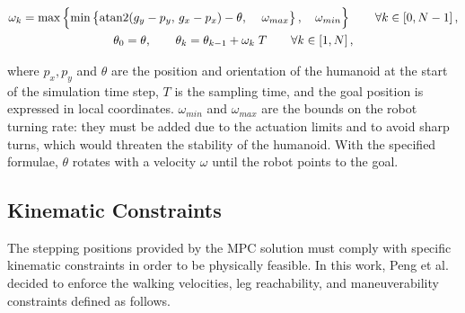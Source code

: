 \documentclass[main.tex]{subfiles}
\begin{document}
\begin{gather}
\omega_k = \max \left\{ \min \left\{ \operatorname{atan2}(g_y - p_y,\, g_x - p_x) - \theta,\, \quad \omega_{max} \right\} ,\quad \omega_{min} \right\} \qquad \forall k \in \left[0, N-1 \right], \notag \\
\theta_0 = \theta, \qquad \theta_k = \theta_{k-1} + \omega_k\;T \qquad \forall k \in \left[1, N\right], \notag
\end{gather}

where $p_x, p_y$ and $\theta$ are the position and orientation of the humanoid at the start of the simulation time step, $T$ is the sampling time, and the goal position is expressed in local coordinates. $\omega_{min}$ and $\omega_{max}$ are the bounds on the robot turning rate: they must be added due to the actuation limits and to avoid sharp turns, which would threaten the stability of the humanoid. With the specified formulae, $\theta$ rotates with a velocity $\omega$ until the robot points to the goal.

\subsection{Kinematic Constraints}
The stepping positions provided by the MPC solution must comply with specific kinematic constraints in order to be physically feasible. In this work, Peng et al. decided to enforce the walking velocities, leg reachability, and maneuverability constraints defined as follows.
\end{document}
